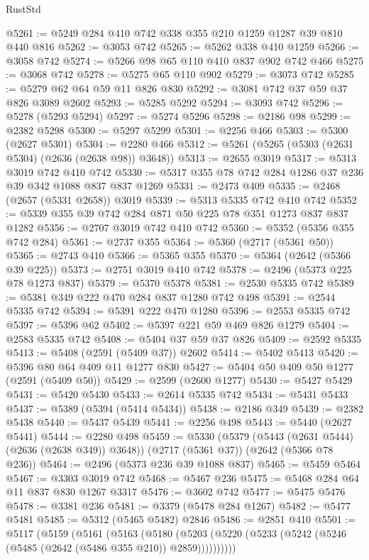 \begin{lexlean}{RustStd}
\begin{coremodule}
@5261 := @5249 @284 @410 @742 @338 @355 @210 @1259 @1287 @39 @810 @440 @816
@5262 := @3053 @742
@5265 := @5262 @338 @410 @1259
@5266 := @3058 @742
@5274 := @5266 @98 @65 @110 @410 @837 @902 @742 @466
@5275 := @3068 @742
@5278 := @5275 @65 @110 @902
@5279 := @3073 @742
@5285 := @5279 @62 @64 @59 @11 @826 @830
@5292 := @3081 @742 @37 @59 @37 @826 @3089 @2602
@5293 := @5285 @5292
@5294 := @3093 @742
@5296 := @5278 (@5293 @5294)
@5297 := @5274 @5296
@5298 := @2186 @98
@5299 := @2382 @5298
@5300 := @5297 @5299
@5301 := @2256 @466
@5303 := @5300 (@2627 @5301)
@5304 := @2280 @466
@5312 := @5261 (@5265 (@5303 (@2631 @5304) (@2636 (@2638 @98)) @3648))
@5313 := @2655 @3019
@5317 := @5313 @3019 @742 @410 @742
@5330 := @5317 @355 @78 @742 @284 @1286 @37 @236 @39 @342 @1088 @837 @837 @1269
@5331 := @2473 @409
@5335 := @2468 (@2657 (@5331 @2658)) @3019
@5339 := @5313 @5335 @742 @410 @742
@5352 := @5339 @355 @39 @742 @284 @871 @50 @225 @78 @351 @1273 @837 @837 @1282
@5356 := @2707 @3019 @742 @410 @742
@5360 := @5352 (@5356 @355 @742 @284)
@5361 := @2737 @355
@5364 := @5360 (@2717 (@5361 @50))
@5365 := @2743 @410
@5366 := @5365 @355
@5370 := @5364 (@2642 (@5366 @39 @225))
@5373 := @2751 @3019 @410 @742
@5378 := @2496 (@5373 @225 @78 @1273 @837)
@5379 := @5370 @5378
@5381 := @2530 @5335 @742
@5389 := @5381 @349 @222 @470 @284 @837 @1280 @742 @498
@5391 := @2544 @5335 @742
@5394 := @5391 @222 @470 @1280
@5396 := @2553 @5335 @742
@5397 := @5396 @62
@5402 := @5397 @221 @59 @469 @826 @1279
@5404 := @2583 @5335 @742
@5408 := @5404 @37 @59 @37 @826
@5409 := @2592 @5335
@5413 := @5408 (@2591 (@5409 @37)) @2602
@5414 := @5402 @5413
@5420 := @5396 @80 @64 @409 @11 @1277 @830
@5427 := @5404 @50 @409 @50 @1277 (@2591 (@5409 @50))
@5429 := @2599 (@2600 @1277)
@5430 := @5427 @5429
@5431 := @5420 @5430
@5433 := @2614 @5335 @742
@5434 := @5431 @5433
@5437 := @5389 (@5394 (@5414 @5434))
@5438 := @2186 @349
@5439 := @2382 @5438
@5440 := @5437 @5439
@5441 := @2256 @498
@5443 := @5440 (@2627 @5441)
@5444 := @2280 @498
@5459 := @5330
    (@5379 (@5443 (@2631 @5444) (@2636 (@2638 @349)) @3648))
    (@2717 (@5361 @37))
    (@2642 (@5366 @78 @236))
@5464 := @2496 (@5373 @236 @39 @1088 @837)
@5465 := @5459 @5464
@5467 := @3303 @3019 @742
@5468 := @5467 @236
@5475 := @5468 @284 @64 @11 @837 @830 @1267 @3317
@5476 := @3602 @742
@5477 := @5475 @5476
@5478 := @3381 @236
@5481 := @3379 (@5478 @284 @1267)
@5482 := @5477 @5481
@5485 := @5312 (@5465 @5482) @2846
@5486 := @2851 @410
@5501 := @5117
    (@5159
      (@5161
        (@5163
          (@5180 (@5203 (@5220 (@5233 (@5242 (@5246 (@5485 (@2642 (@5486 @355 @210)) @2859))))))))))

\end{coremodule}
\end{lexlean}
